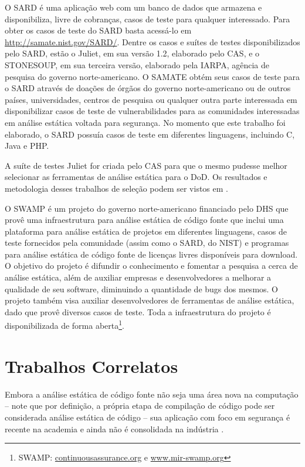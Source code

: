   O SARD é uma aplicação web com um banco de dados que armazena e disponibiliza, livre de cobranças, casos de teste para qualquer interessado. Para obter os casos de teste do SARD basta acessá-lo em \url{http://samate.nist.gov/SARD/}. Dentre os casos e suítes de testes disponibilizados pelo SARD, estão o Juliet, em sua versão 1.2, elaborado pelo CAS, e o STONESOUP, em sua terceira versão, elaborado pela IARPA, agência de pesquisa do governo norte-americano. O SAMATE obtém seus casos de teste para o SARD através de doações de órgãos do governo norte-americano ou de outros países, universidades, centros de pesquisa ou qualquer outra parte interessada em disponibilizar casos de teste de vulnerabilidades para as comunidades interessadas em análise estática voltada para segurança. No momento que este trabalho foi elaborado, o SARD possuía casos de teste em diferentes linguagens, incluindo C, Java e PHP.

  A suíte de testes Juliet for criada pelo CAS para que o mesmo pudesse melhor selecionar as ferramentas de análise estática para o DoD. Os resultados e metodologia desses trabalhos de seleção podem ser vistos em \cite{nsa}.

  O SWAMP é um projeto do governo norte-americano financiado pelo DHS que provê uma infraestrutura para análise estática de código fonte que inclui uma plataforma para análise estática de projetos em diferentes linguagens, casos de teste fornecidos pela comunidade (assim como o SARD, do NIST) e programas para análise estática de código fonte de licenças livres disponíveis para download. O objetivo do projeto é difundir o conhecimento e fomentar a pesquisa a cerca de análise estática, além de auxiliar empresas e desenvolvedores a melhorar a qualidade de seu software, diminuindo a quantidade de bugs dos mesmos. O projeto também visa auxiliar desenvolvedores de ferramentas de análise estática, dado que provê diversos casos de teste. Toda a infraestrutura do projeto é disponibilizada de forma aberta\footnote{SWAMP: \url{continuousassurance.org} e \url{www.mir-swamp.org}}.                   

  \section{Trabalhos Correlatos}

  Embora a análise estática de código fonte não seja uma  área nova na computação – note que por definição, a própria etapa de compilação de código pode ser considerada análise estática de código – sua aplicação com foco em segurança é recente na academia e ainda não é consolidada na indústria \cite{johnson2013don}.


